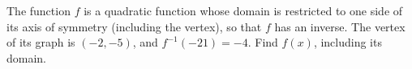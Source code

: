 The function $f$ is a quadratic function whose domain is restricted to one side of its axis of symmetry (including the vertex), so that $f$ has an inverse. The vertex of its graph is $(-2,-5)$, and $f^{-1}(-21)=-4$. Find $f(x)$, including its domain.
